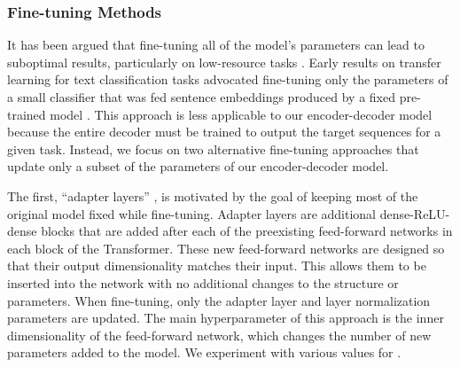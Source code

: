 \documentclass[twoside,11pt]{article}
\begin{document}
\subsubsection{Fine-tuning Methods}

It has been argued that fine-tuning all of the model's parameters can lead to suboptimal results, particularly on low-resource tasks \citep{peters2019tune}.
Early results on transfer learning for text classification tasks advocated fine-tuning only the parameters of a small classifier that was fed sentence embeddings produced by a fixed pre-trained model \citep{subramanian2018learning,kiros2015skip,logeswaran2018efficient,hill2016learning,conneau2017supervised}.
This approach is less applicable to our encoder-decoder model because the entire decoder must be trained to output the target sequences for a given task.
Instead, we focus on two alternative fine-tuning approaches that update only a subset of the parameters of our encoder-decoder model.

The first, ``adapter layers'' \citep{houlsby2019parameter,bapna2019simple}, is motivated by the goal of keeping most of the original model fixed while fine-tuning.
Adapter layers are additional dense-ReLU-dense blocks that are added after each of the preexisting feed-forward networks in each block of the Transformer.
These new feed-forward networks are designed so that their output dimensionality matches their input.
This allows them to be inserted into the network with no additional changes to the structure or parameters.
When fine-tuning, only the adapter layer and layer normalization parameters are updated.
The main hyperparameter of this approach is the inner dimensionality  of the feed-forward network, which changes the number of new parameters added to the model.
We experiment with various values for .
\end{document}
